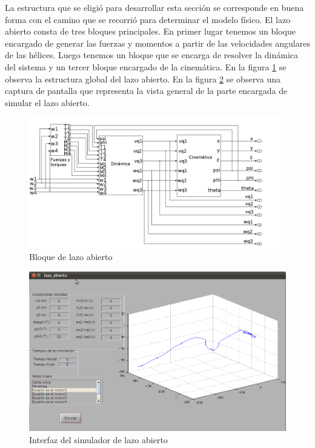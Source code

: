 \documentclass[main]{subfiles}
\begin{document}
La estructura que se eligi\'o para desarrollar esta secci\'on se corresponde en buena forma con el camino que se recorri\'o para determinar el modelo f\'isico. El lazo abierto consta de tres bloques principales. En primer lugar tenemos un bloque encargado de generar las fuerzas y momentos a partir de las velocidades angulares de las h\'elices. Luego tenemos un bloque que se encarga de resolver la din\'amica del sistema y un tercer bloque encargado de la cinem\'atica. En la figura \ref{fig:lazo_abierto} se observa la estructura global del lazo abierto. En la figura \ref{fig:vista} se observa una captura de pantalla que representa la vista general de la parte encargada de simular el lazo abierto.
\begin{figure}[h!]
	\centering
	\includegraphics[width=1\textwidth]{./pics_simulador/lazo_abierto.png}
	\caption{Bloque de lazo abierto}
	\label{fig:lazo_abierto}
\end{figure}

\begin{figure}[h!]
	\centering
	\includegraphics[width=1\textwidth]{./pics_simulador/vista.png}
	\caption{Interfaz del simulador de lazo abierto}
	\label{fig:vista}
\end{figure}
\end{document}
